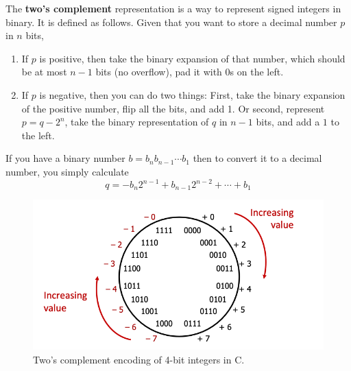 \documentclass{article}
\begin{document}
    \begin{theorem}
      The \textbf{two's complement} representation is a way to represent signed integers in binary. It is defined as follows. Given that you want to store a decimal number $p$ in $n$ bits, 

      \begin{enumerate}
        \item If $p$ is positive, then take the binary expansion of that number, which should be at most $n-1$ bits (no overflow), pad it with $0$s on the left. 
        \item If $p$ is negative, then you can do two things: First, take the binary expansion of the positive number, flip all the bits, and add 1. Or second, represent $p = q - 2^n$, take the binary representation of $q$ in $n-1$ bits, and add a $1$ to the left. 
      \end{enumerate}
      If you have a binary number $b = b_{n}b_{n-1}\cdots b_1$ then to convert it to a decimal number, you simply calculate 
      \begin{equation}
        q = -b_{n}2^{n-1} + b_{n-1}2^{n-2} + \cdots + b_1
      \end{equation}
      \begin{figure}[H]
        \centering 
        \includegraphics[scale=0.4]{img/twos_complement_encoding.png}
        \caption{Two's complement encoding of 4-bit integers in C.} 
        \label{fig:twos_complement_encoding}
      \end{figure}
    \end{theorem}
\end{document}
